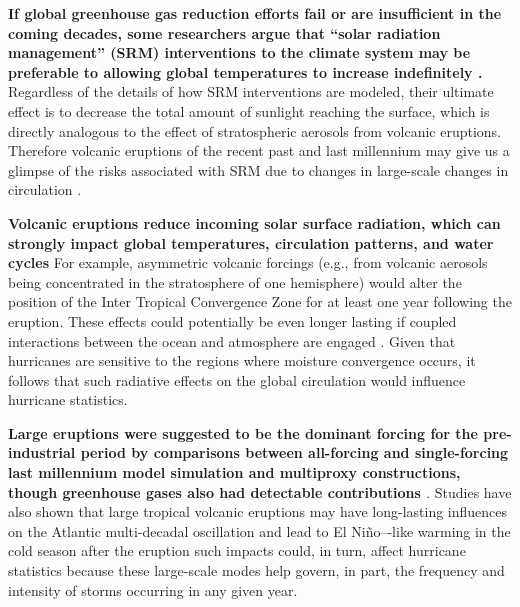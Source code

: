 \documentclass[phd,tocprelim]{cornell}
\begin{document}
\textbf{If global greenhouse gas reduction efforts fail or are
  insufficient in the coming decades, some researchers argue that
  ``solar radiation management'' (SRM) interventions to the climate system
  may be preferable to allowing global temperatures to increase
  indefinitely \cite{govindasamy2000,caldeira2008,kravitz2014multi,
  macmartin2019}.} 
  Regardless of the
details of how SRM interventions are modeled, their ultimate effect is
to decrease the total amount of sunlight reaching the surface, which
is directly analogous to the effect of stratospheric aerosols from
volcanic eruptions. Therefore volcanic eruptions of the recent past
and last millennium may give us a glimpse of the risks associated with
SRM due to changes in large-scale changes in circulation \cite{rasch2008}.

\textbf{Volcanic eruptions reduce incoming solar surface radiation,
  which can strongly impact global temperatures, circulation patterns,
  and water cycles} For example, asymmetric
volcanic forcings (e.g., from volcanic aerosols being concentrated in
the stratosphere of one hemisphere) would alter the position of the
Inter Tropical Convergence Zone for at least one year following the
eruption. These effects could potentially be even longer lasting if
coupled interactions between the ocean and atmosphere are engaged 
\cite{colose2016hemispherically,raible2016tambora,stevenson2016nino, 
schurer2014small,schurer2013separating}. 
Given that hurricanes are sensitive to the
regions where moisture convergence occurs, it follows that such
radiative effects on the global circulation would influence hurricane
statistics.


\textbf{Large eruptions were suggested to be the dominant forcing for
  the pre-industrial period by comparisons between all-forcing and
  single-forcing last millennium model simulation and multiproxy
  constructions, though greenhouse gases also had detectable
  contributions \cite{schurer2013separating, schurer2014small}}. 
  Studies have also shown that large tropical volcanic eruptions 
  may have long-lasting
influences on the Atlantic multi-decadal oscillation and lead to El
Ni\~no–-like warming in the cold season after the eruption \cite{gcm_lme,
stevenson2016nino} such impacts could, in turn, affect hurricane 
statistics because these large-scale modes help
govern, in part, the frequency and intensity of storms occurring in any
given year.
\end{document}

